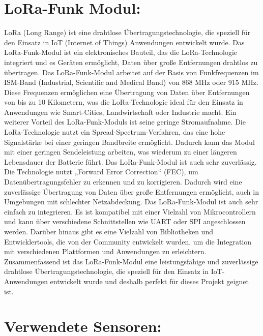 \section{LoRa-Funk Modul:}
LoRa (Long Range) ist eine drahtlose Übertragungstechnologie, die speziell für den Einsatz in IoT (Internet of Things) Anwendungen entwickelt wurde. 
Das LoRa-Funk-Modul ist ein elektronisches Bauteil, das die LoRa-Technologie integriert und es Geräten ermöglicht, Daten über große Entfernungen drahtlos zu übertragen. 
Das LoRa-Funk-Modul arbeitet auf der Basis von Funkfrequenzen im ISM-Band (Industrial, Scientific and Medical Band) von 868 MHz oder 915 MHz. 
Diese Frequenzen ermöglichen eine Übertragung von Daten über Entfernungen von bis zu 10 Kilometern, was die LoRa-Technologie ideal für den Einsatz in Anwendungen wie Smart-Cities, Landwirtschaft oder Industrie macht. 
Ein weiterer Vorteil des LoRa-Funk-Moduls ist seine geringe Stromaufnahme. Die LoRa-Technologie nutzt ein Spread-Spectrum-Verfahren, das eine hohe Signalstärke bei einer geringen Bandbreite ermöglicht. 
Dadurch kann das Modul mit einer geringen Sendeleistung arbeiten, was wiederum zu einer längeren Lebensdauer der Batterie führt. 
Das LoRa-Funk-Modul ist auch sehr zuverlässig. 
Die Technologie nutzt „Forward Error Correction“ (FEC), um Datenübertragungsfehler zu erkennen und zu korrigieren. 
Dadurch wird eine zuverlässige Übertragung von Daten über große Entfernungen ermöglicht, auch in Umgebungen mit schlechter Netzabdeckung. 
Das LoRa-Funk-Modul ist auch sehr einfach zu integrieren. Es ist kompatibel mit einer Vielzahl von Mikrocontrollern und kann über verschiedene Schnittstellen wie UART oder SPI angeschlossen werden. 
Darüber hinaus gibt es eine Vielzahl von Bibliotheken und Entwicklertools, die von der Community entwickelt wurden, um die Integration mit verschiedenen Plattformen und Anwendungen zu erleichtern. 
\newline 
Zusammenfassend ist das LoRa-Funk-Modul eine leistungsfähige und zuverlässige drahtlose Übertragungstechnologie, die speziell für den Einsatz in IoT-Anwendungen entwickelt wurde und deshalb perfekt für dieses Projekt geignet ist.


\newpage
\section{Verwendete Sensoren:}
